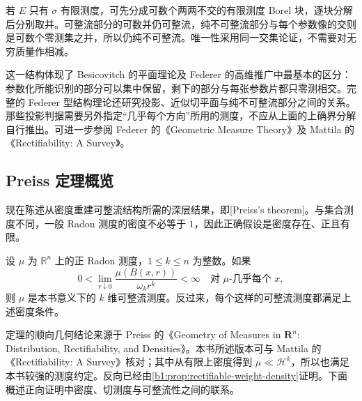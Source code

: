 若 \(E\) 只有 \(\sigma\) 有限测度，可先分成可数个两两不交的有限测度 Borel 块，逐块分解后分别取并。可整流部分的可数并仍可整流，纯不可整流部分与每个参数像的交则是可数个零测集之并，所以仍纯不可整流。唯一性采用同一交集论证，不需要对无穷质量作相减。

\ProseParagraphBreak

这一结构体现了 Besicovitch 的平面理论及 Federer 的高维推广中最基本的区分：参数化所能识别的部分可以集中保留，剩下的部分与每张参数片都只零测相交。完整的 Federer 型结构理论还研究投影、近似切平面与纯不可整流部分之间的关系。那些投影判据需要另外指定“几乎每个方向”所用的测度，不应从上面的上确界分解自行推出。可进一步参阅 Federer 的《Geometric Measure Theory》\cite{Federer1996Geometric}及 Mattila 的《Rectifiability: A Survey》\cite[Section 4]{Mattila2023Rectifiability}。

\subsection{Preiss 定理概览}
\label{b1:subsec:190404}

现在陈述从密度重建可整流结构所需的深层结果，即[Preiss's theorem]。与集合测度不同，一般 Radon 测度的密度不必等于 \(1\)，因此正确假设是密度存在、正且有限。

\begin{theorem}[Preiss]\label{b1:thm:preiss-rectifiability}
设 \(\mu\) 为 \(\mathbb R^n\) 上的正 Radon 测度，\(1\leq k\leq n\) 为整数。如果
\[
 0<\lim_{r\downarrow0}\frac{\mu(B(x,r))}{\omega_kr^k}<\infty
 \quad\text{对 }\mu\text{-几乎每个 }x,
\]
则 \(\mu\) 是本书意义下的 \(k\) 维可整流测度。反过来，每个这样的可整流测度都满足上述密度条件。
\end{theorem}

定理的顺向几何结论来源于 Preiss 的《Geometry of Measures in \(\mathbf R^n\): Distribution, Rectifiability, and Densities》\cite{Preiss1987Geometry}。本书所述版本可与 Mattila 的《Rectifiability: A Survey》\cite[Theorem 4.11 and the following discussion]{Mattila2023Rectifiability}核对；其中从有限上密度得到 \(\mu\ll\mathcal H^k\)，所以也满足本书较强的测度约定。反向已经由\cref{b1:prop:rectifiable-weight-density}证明。下面概述正向证明中密度、切测度与可整流性之间的联系。

